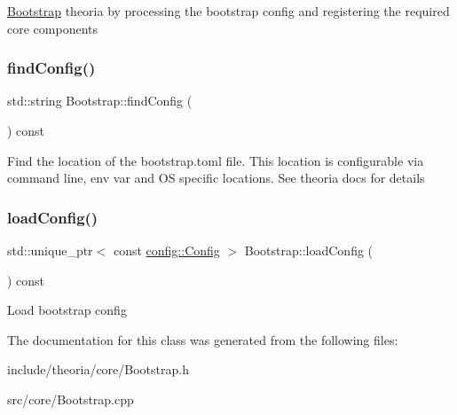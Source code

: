 \hyperlink{classtheoria_1_1core_1_1Bootstrap}{Bootstrap} theoria by processing the bootstrap config and registering the required core components \mbox{\label{classtheoria_1_1core_1_1Bootstrap_a8bc0d6ee72439172ca309df9fb7bf094}} 
\subsubsection{\texorpdfstring{find\+Config()}{findConfig()}}
{\footnotesize\ttfamily std\+::string Bootstrap\+::find\+Config (\begin{DoxyParamCaption}{ }\end{DoxyParamCaption}) const}

Find the location of the bootstrap.\+toml file. This location is configurable via command line, env var and OS specific locations. See theoria docs for details \mbox{\label{classtheoria_1_1core_1_1Bootstrap_a3ed8e5694e2a5d9136ad00c8eeb13022}} 
\subsubsection{\texorpdfstring{load\+Config()}{loadConfig()}}
{\footnotesize\ttfamily std\+::unique\+\_\+ptr$<$ const \hyperlink{classtheoria_1_1config_1_1Config}{config\+::\+Config} $>$ Bootstrap\+::load\+Config (\begin{DoxyParamCaption}{ }\end{DoxyParamCaption}) const}

Load bootstrap config 

The documentation for this class was generated from the following files\+:\begin{DoxyCompactItemize}
\item 
include/theoria/core/Bootstrap.\+h\item 
src/core/Bootstrap.\+cpp\end{DoxyCompactItemize}
